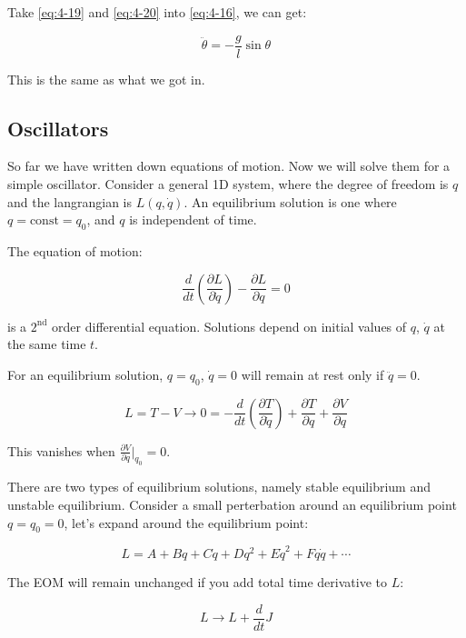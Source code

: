 Take \ref{eq:4-19} and \ref{eq:4-20} into \ref{eq:4-16}, we can get:

\begin{equation}
    \ddot{\theta} = -\frac{g}{l} \sin \theta
\end{equation}

This is the same as what we got in.

\subsection{Oscillators}

So far we have written down equations of motion. Now we will solve them for a simple oscillator. Consider a general 1D system, where the degree of freedom is $q$ and the langrangian is $L\left(q, \dot{q}\right)$. An equilibrium solution is one where $q = \text{const} = q_0$, and $q$ is independent of time.

The equation of motion:

\begin{equation}
    \frac{d}{dt} \left(\frac{\partial L}{\partial \dot{q}}\right) - \frac{\partial L}{\partial q} = 0
\end{equation}

is a $2^\text{nd}$ order differential equation. Solutions depend on initial values of $q$, $\dot{q}$ at the same time $t$.

For an equilibrium solution, $q = q_0$, $\dot{q} = 0$ will remain at rest only if $\ddot{q} = 0$.

\begin{equation}
    L = T - V \rightarrow 0 = - \frac{d}{dt} \left(\frac{\partial T}{\partial \dot{q}}\right) + \frac{\partial T}{\partial q} + \frac{\partial V}{\partial q}
\end{equation}

This vanishes when $\frac{\partial V}{\partial q} \big |_{q_0} = 0$.

There are two types of equilibrium solutions, namely stable equilibrium and unstable equilibrium. Consider a small perterbation around an equilibrium point $q=q_0=0$, let's expand around the equilibrium point:

\begin{equation}
    L = A + Bq + C\dot{q} + Dq^2 + E\dot{q}^2 + Fq\dot{q} + \cdots
\end{equation}

The EOM will remain unchanged if you add total time derivative to $L$:

\begin{equation}
    L \rightarrow L + \frac{d}{dt} J 
\end{equation}

